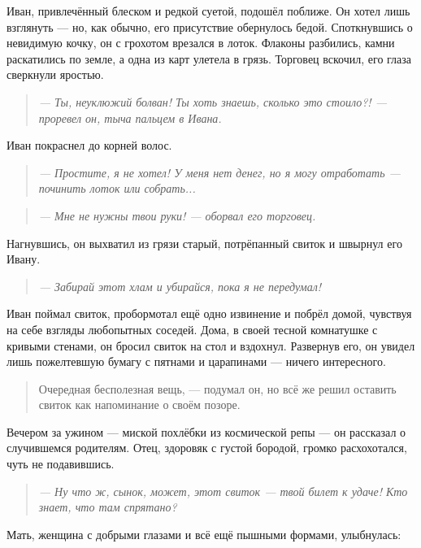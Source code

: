 \documentclass[12pt,a4paper]{book}
\newenvironment{dialogue}{\begin{quote}\itshape}{\end{quote}}
\begin{document}
Иван, привлечённый блеском и редкой суетой, подошёл поближе. Он хотел лишь взглянуть --- но, как обычно, его присутствие обернулось бедой. Споткнувшись о невидимую кочку, он с грохотом врезался в лоток. Флаконы разбились, камни раскатились по земле, а одна из карт улетела в грязь. Торговец вскочил, его глаза сверкнули яростью.

\begin{dialogue}
--- Ты, неуклюжий болван! Ты хоть знаешь, сколько это стоило?! --- проревел он, тыча пальцем в Ивана.
\end{dialogue}

Иван покраснел до корней волос.

\begin{dialogue}
--- Простите, я не хотел! У меня нет денег, но я могу отработать --- починить лоток или собрать...
\end{dialogue}

\begin{dialogue}
--- Мне не нужны твои руки! --- оборвал его торговец.
\end{dialogue}

Нагнувшись, он выхватил из грязи старый, потрёпанный свиток и швырнул его Ивану.

\begin{dialogue}
--- Забирай этот хлам и убирайся, пока я не передумал!
\end{dialogue}

Иван поймал свиток, пробормотал ещё одно извинение и побрёл домой, чувствуя на себе взгляды любопытных соседей. Дома, в своей тесной комнатушке с кривыми стенами, он бросил свиток на стол и вздохнул. Развернув его, он увидел лишь пожелтевшую бумагу с пятнами и царапинами --- ничего интересного.

\begin{quote}
Очередная бесполезная вещь, --- подумал он, но всё же решил оставить свиток как напоминание о своём позоре.
\end{quote}

Вечером за ужином --- миской похлёбки из космической репы --- он рассказал о случившемся родителям. Отец, здоровяк с густой бородой, громко расхохотался, чуть не подавившись.

\begin{dialogue}
--- Ну что ж, сынок, может, этот свиток --- твой билет к удаче! Кто знает, что там спрятано?
\end{dialogue}

Мать, женщина с добрыми глазами и всё ещё пышными формами, улыбнулась:
\end{document}
